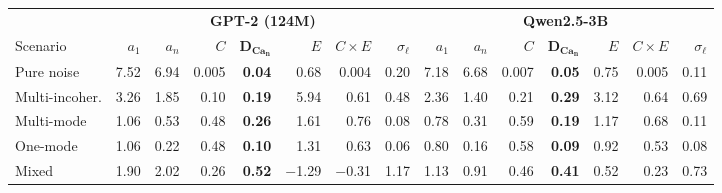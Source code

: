 \begin{tabular}{@{}l rrrrrrr rrrrrrr@{}}
\toprule
& \multicolumn{7}{c}{\textbf{GPT-2 (124M)}} & \multicolumn{7}{c}{\textbf{Qwen2.5-3B}} \\
\cmidrule(lr){2-8} \cmidrule(lr){9-15}
Scenario & $a_1$ & $a_n$ & $C$ & $\mathbf{D_{Ca_n}}$ & $E$ & $C\!\times\!E$ & $\sigma_\ell$ & $a_1$ & $a_n$ & $C$ & $\mathbf{D_{Ca_n}}$ & $E$ & $C\!\times\!E$ & $\sigma_\ell$ \\
\midrule
Pure noise & 7.52 & 6.94 & 0.005 & \textbf{0.04} & 0.68 & 0.004 & 0.20 & 7.18 & 6.68 & 0.007 & \textbf{0.05} & 0.75 & 0.005 & 0.11 \\
Multi-incoher. & 3.26 & 1.85 & 0.10 & \textbf{0.19} & 5.94 & 0.61 & 0.48 & 2.36 & 1.40 & 0.21 & \textbf{0.29} & 3.12 & 0.64 & 0.69 \\
Multi-mode & 1.06 & 0.53 & 0.48 & \textbf{0.26} & 1.61 & 0.76 & 0.08 & 0.78 & 0.31 & 0.59 & \textbf{0.19} & 1.17 & 0.68 & 0.11 \\
One-mode & 1.06 & 0.22 & 0.48 & \textbf{0.10} & 1.31 & 0.63 & 0.06 & 0.80 & 0.16 & 0.58 & \textbf{0.09} & 0.92 & 0.53 & 0.08 \\
Mixed & 1.90 & 2.02 & 0.26 & \textbf{0.52} & $-$1.29 & $-$0.31 & 1.17 & 1.13 & 0.91 & 0.46 & \textbf{0.41} & 0.52 & 0.23 & 0.73 \\
\bottomrule
\end{tabular}
